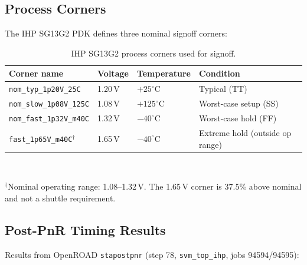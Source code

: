 \documentclass[11pt]{article}
\begin{document}
\subsection{Process Corners}

The IHP SG13G2 PDK defines three nominal signoff corners:

\begin{table}[H]
  \centering
  \caption{IHP SG13G2 process corners used for signoff.}
  \label{tab:corners}
  \small
  \begin{tabular}{llll}
    \toprule
    Corner name & Voltage & Temperature & Condition \\
    \midrule
    \texttt{nom\_typ\_1p20V\_25C}   & 1.20\,V & $+25^\circ\mathrm{C}$ & Typical (TT) \\
    \texttt{nom\_slow\_1p08V\_125C} & 1.08\,V & $+125^\circ\mathrm{C}$ & Worst-case setup (SS) \\
    \texttt{nom\_fast\_1p32V\_m40C} & 1.32\,V & $-40^\circ\mathrm{C}$ & Worst-case hold (FF) \\
    \midrule
    \texttt{fast\_1p65V\_m40C}$^\dagger$ & 1.65\,V & $-40^\circ\mathrm{C}$ & Extreme hold (outside op range) \\
    \bottomrule
  \end{tabular}
  \\[4pt]
  \raggedright\small $^\dagger$Nominal operating range: 1.08--1.32\,V.
  The 1.65\,V corner is 37.5\% above nominal and not a shuttle requirement.
\end{table}

\subsection{Post-PnR Timing Results}

Results from OpenROAD \texttt{stapostpnr} (step 78, \texttt{svm\_top\_ihp},
jobs 94594/94595):
\end{document}
